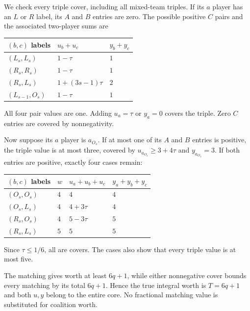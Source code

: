 \documentclass[11pt]{article}
\theoremstyle{remark}\newtheorem{remark}[theorem]{Remark}
\begin{document}
We check every triple cover, including all mixed-team triples. If its
$a$ player has an $L$ or $R$ label, its $A$ and $B$ entries are zero.
The possible positive $C$ pairs and the associated two-player sums are
\begin{center}
\begin{tabular}{lll}\toprule
$(b,c)$ labels & $u_b+u_c$ & $y_b+y_c$\\\midrule
$(L_s,L_s)$ & $1-\tau$ & $1$\\
$(R_s,R_s)$ & $1-\tau$ & $1$\\
$(R_s,L_s)$ & $1+(3s-1)\tau$ & $2$\\
$(L_{s-1},O_s)$ & $1-\tau$ & $1$\\\bottomrule
\end{tabular}
\end{center}
All four pair values are one. Adding $u_a=\tau$ or $y_a=0$ covers the
triple. Zero $C$ entries are covered by nonnegativity.

Now suppose its $a$ player is $a_{O_s}$. If at most one of its $A$ and
$B$ entries is positive, the triple value is at most three, covered by
$u_{a_{O_s}}\geq3+4\tau$ and $y_{a_{O_s}}=3$.
If both entries are positive, exactly four cases remain:
\begin{center}
\begin{tabular}{llll}\toprule
$(b,c)$ labels & $w$ & $u_a+u_b+u_c$ & $y_a+y_b+y_c$\\\midrule
$(O_s,O_s)$ & $4$ & $4$ & $4$\\
$(O_s,L_s)$ & $4$ & $4+3\tau$ & $4$\\
$(R_s,O_s)$ & $4$ & $5-3\tau$ & $5$\\
$(R_s,L_s)$ & $5$ & $5$ & $5$\\\bottomrule
\end{tabular}
\end{center}
Since $\tau\leq1/6$, all are covers. The cases also show that every
triple value is at most five.

The matching gives worth at least $6q+1$, while either nonnegative
cover bounds every matching by its total $6q+1$. Hence the true integral
worth is $T=6q+1$ and both $u,y$ belong to the entire core. No fractional
matching value is substituted for coalition worth.
\end{document}
